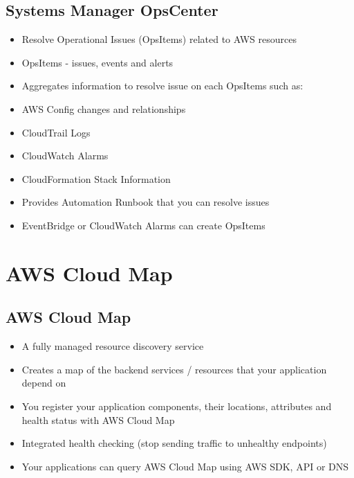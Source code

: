 \subsection{Systems Manager OpsCenter}
\begin{itemize}
    \item Resolve Operational Issues (OpsItems) related to AWS resources
    \item OpsItems - issues, events and alerts
    \item Aggregates information to resolve issue on each OpsItems such as:
    \item AWS Config changes and relationships
    \item CloudTrail Logs
    \item CloudWatch Alarms
    \item CloudFormation Stack Information
    \item Provides Automation Runbook that you can resolve issues
    \item EventBridge or CloudWatch Alarms can create OpsItems
\end{itemize}


\section{AWS Cloud Map}

\subsection{AWS Cloud Map}
\begin{itemize}
    \item A fully managed resource discovery service
    \item Creates a map of the backend services / resources that your application depend on
    \item You register your application components, their locations, attributes and health status with AWS Cloud Map
    \item Integrated health checking (stop sending traffic to unhealthy endpoints)
    \item Your applications can query AWS Cloud Map using AWS SDK, API or DNS
\end{itemize}
